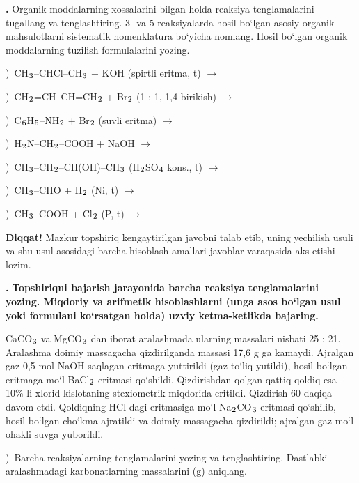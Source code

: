 \documentclass[11pt,a4paper]{article}
\renewcommand{\textsubscript}[1]{\ensuremath{_{\text{\fontsize{8}{8}\selectfont #1}}}}
\newcommand{\qn}[1]{\textbf{\fontsize{11.5}{13}\selectfont #1}}
\newcommand{\qsep}{\par\vspace{13pt}}
\newcommand{\diqqat}[1]{\par\smallskip\noindent\textbf{Diqqat!} #1\par\medskip}
\begin{document}
\noindent\qn{42.} Organik moddalarning xossalarini bilgan holda reaksiya tenglamalarini tugallang va tenglashtiring. 3- va 5-reaksiyalarda hosil bo`lgan asosiy organik mahsulotlarni sistematik nomenklatura bo`yicha nomlang. Hosil bo`lgan organik moddalarning tuzilish formulalarini yozing.\par
{})\ CH\textsubscript{3}--CHCl--CH\textsubscript{3} + KOH (spirtli eritma, t) $\to$\par
{})\ CH\textsubscript{2}=CH--CH=CH\textsubscript{2} + Br\textsubscript{2} (1 : 1, 1,4-birikish) $\to$\par
{})\ C\textsubscript{6}H\textsubscript{5}--NH\textsubscript{2} + Br\textsubscript{2} (suvli eritma) $\to$\par
{})\ H\textsubscript{2}N--CH\textsubscript{2}--COOH + NaOH $\to$\par
{})\ CH\textsubscript{3}--CH\textsubscript{2}--CH(OH)--CH\textsubscript{3} (H\textsubscript{2}SO\textsubscript{4} kons., t) $\to$\par
{})\ CH\textsubscript{3}--CHO + H\textsubscript{2} (Ni, t) $\to$\par
{})\ CH\textsubscript{3}--COOH + Cl\textsubscript{2} (P, t) $\to$\par
\diqqat{Mazkur topshiriq kengaytirilgan javobni talab etib, uning yechilish usuli va shu usul asosidagi barcha hisoblash amallari javoblar varaqasida aks etishi lozim.}\qsep
\noindent\qn{43.} \textbf{Topshiriqni bajarish jarayonida barcha reaksiya tenglamalarini yozing. Miqdoriy va arifmetik hisoblashlarni (unga asos bo`lgan usul yoki formulani ko`rsatgan holda) uzviy ketma-ketlikda bajaring.}\par\smallskip
CaCO\textsubscript{3} va MgCO\textsubscript{3} dan iborat aralashmada ularning massalari nisbati 25 : 21. Aralashma doimiy massagacha qizdirilganda massasi 17,6 g ga kamaydi. Ajralgan gaz 0,5 mol NaOH saqlagan eritmaga yuttirildi (gaz to`liq yutildi), hosil bo`lgan eritmaga mo`l BaCl\textsubscript{2} eritmasi qo`shildi. Qizdirishdan qolgan qattiq qoldiq esa 10\% li xlorid kislotaning stexiometrik miqdorida eritildi. Qizdirish 60 daqiqa davom etdi. Qoldiqning HCl dagi eritmasiga mo`l Na\textsubscript{2}CO\textsubscript{3} eritmasi qo`shilib, hosil bo`lgan cho`kma ajratildi va doimiy massagacha qizdirildi; ajralgan gaz mo`l ohakli suvga yuborildi.\par
{})\ Barcha reaksiyalarning tenglamalarini yozing va tenglashtiring. Dastlabki aralashmadagi karbonatlarning massalarini (g) aniqlang.\par
\end{document}
